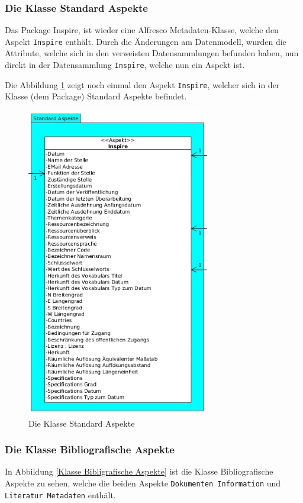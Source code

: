 \subsubsection{Die Klasse Standard Aspekte}\label{Die Klasse Standard Aspekte}
Das Package Inspire, ist wieder eine Alfresco Metadaten-Klasse, welche den Aspekt \texttt{Inspire} enth\"alt. Durch die \"Anderungen am Datenmodell, wurden die Attribute, welche sich in den verweisten Datensammlungen befunden haben, nun direkt in der Datensammlung \texttt{Inspire}, welche nun ein Aspekt ist. 

Die Abbildung \ref{Klasse Standard Aspekte} zeigt noch einmal den Aspekt \texttt{Inspire}, welcher sich in der Klasse (dem Package) Standard Aspekte befindet.

\begin{figure}[!ht]
\centering
\includegraphics[width=8cm]{Bilder/AlfrescoModell/Standard-Aspekte.jpg}
\caption{Die Klasse Standard Aspekte}
\label{Klasse Standard Aspekte}
\centering
\end{figure}

\subsubsection{Die Klasse Bibliografische Aspekte}
In Abbildung \ref{Klasse Bibligrafische Aspekte} ist die Klasse Bibliografische Aspekte zu sehen, welche die beiden Aspekte \texttt{Dokumenten Information} und \texttt{Literatur Metadaten} enth\"alt.

